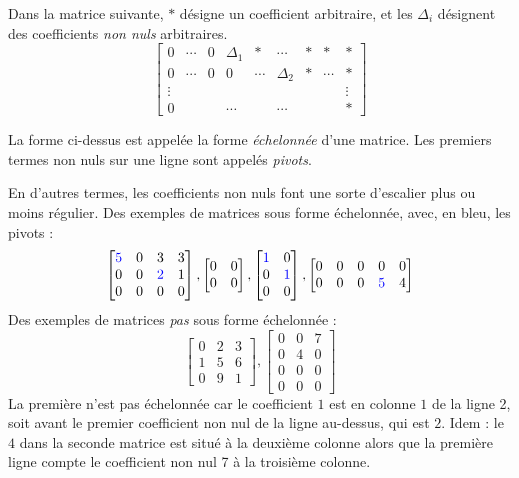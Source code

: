 Dans la matrice suivante, $*$ désigne un coefficient arbitraire, et les $\Delta_i$ désignent des coefficients \textit{non nuls} arbitraires.
$$\begin{bmatrix}
0 & \cdots & 0 & \Delta_1 & * & \cdots & * & * & *\\
0 &\cdots & 0 & 0 & \cdots & \Delta_2 & * &\cdots & *\\
\vdots &&&&&&&&\vdots \\
0 & &&\cdots&&\cdots&&& *
\end{bmatrix}
$$
\begin{boxdef}
La forme ci-dessus est appelée la forme \textit{échelonnée} d'une matrice. Les premiers termes non nuls sur une ligne sont appelés \textit{pivots}.
\end{boxdef}
En d'autres termes, les coefficients non nuls font une sorte d'escalier plus ou moins régulier. Des exemples de matrices sous forme échelonnée, avec, en bleu, les pivots :
$$
\begin{bmatrix}
\color{blue}5 & 0 & 3 & 3 \\
0 & 0 & \color{blue}2 & 1 \\
0 & 0 & 0 & 0
\end{bmatrix},
\begin{bmatrix}
0 & 0 \\
0 & 0
\end{bmatrix},
\begin{bmatrix}
\color{blue}1 & 0\\
0 & \color{blue}1\\
0 & 0
\end{bmatrix},
\begin{bmatrix}
0 & 0 & 0 & 0 & 0 \\
0 & 0 & 0 & \color{blue}5 & 4
\end{bmatrix}
$$
Des exemples de matrices \textit{pas} sous forme échelonnée :
$$
\begin{bmatrix}
0 & 2 & 3 \\
1 & 5 & 6\\
0 & 9 & 1
\end{bmatrix},
\begin{bmatrix}
0 & 0 & 7 \\
0 & 4 & 0\\
0 & 0 & 0\\
0 & 0 & 0
\end{bmatrix}
$$
La première n'est pas échelonnée car le coefficient $1$ est en colonne $1$ de la ligne 2, soit avant le premier coefficient non nul de la ligne au-dessus, qui est $2$. Idem : le $4$ dans la seconde matrice est situé à la deuxième colonne alors que la première ligne compte le coefficient non nul 7 à la troisième colonne.\\

